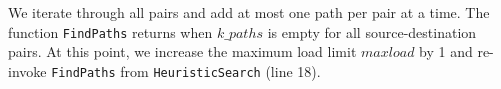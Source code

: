We iterate through all pairs and add at most one path per pair at a time. The function \texttt{FindPaths} returns when $k\_paths$ is empty for all source-destination pairs. At this point, we increase the maximum load limit $maxload$ by 1 and re-invoke \texttt{FindPaths} from \texttt{HeuristicSearch} (line 18). 

